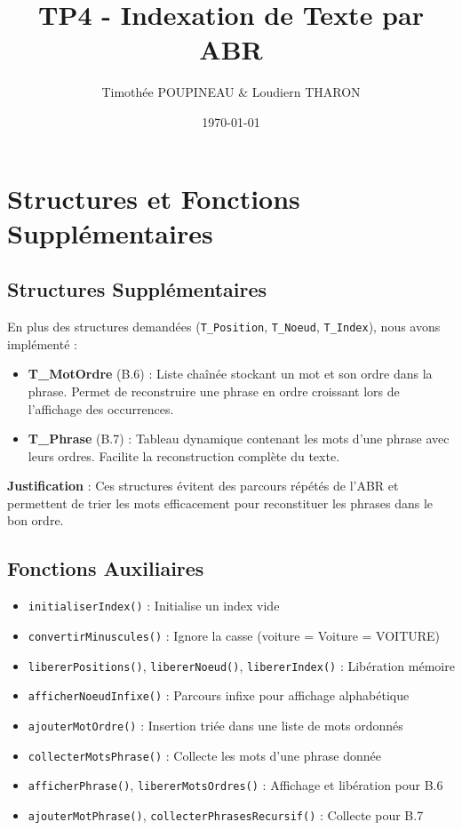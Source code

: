 \documentclass[11pt,a4paper]{article}
\title{\textbf{TP4 - Indexation de Texte par ABR}}
\author{Timothée POUPINEAU \& Loudiern THARON}
\date{\today}
\begin{document}
\maketitle

\section{Structures et Fonctions Supplémentaires}

\subsection{Structures Supplémentaires}

En plus des structures demandées (\texttt{T\_Position}, \texttt{T\_Noeud}, \texttt{T\_Index}), nous avons implémenté :

\begin{itemize}[noitemsep]
    \item \textbf{T\_MotOrdre} (B.6) : Liste chaînée stockant un mot et son ordre dans la phrase. Permet de reconstruire une phrase en ordre croissant lors de l'affichage des occurrences.
    \item \textbf{T\_Phrase} (B.7) : Tableau dynamique contenant les mots d'une phrase avec leurs ordres. Facilite la reconstruction complète du texte.
\end{itemize}

\textbf{Justification} : Ces structures évitent des parcours répétés de l'ABR et permettent de trier les mots efficacement pour reconstituer les phrases dans le bon ordre.

\subsection{Fonctions Auxiliaires}

\begin{itemize}[noitemsep]
    \item \texttt{initialiserIndex()} : Initialise un index vide
    \item \texttt{convertirMinuscules()} : Ignore la casse (voiture = Voiture = VOITURE)
    \item \texttt{libererPositions()}, \texttt{libererNoeud()}, \texttt{libererIndex()} : Libération mémoire
    \item \texttt{afficherNoeudInfixe()} : Parcours infixe pour affichage alphabétique
    \item \texttt{ajouterMotOrdre()} : Insertion triée dans une liste de mots ordonnés
    \item \texttt{collecterMotsPhrase()} : Collecte les mots d'une phrase donnée
    \item \texttt{afficherPhrase()}, \texttt{libererMotsOrdres()} : Affichage et libération pour B.6
    \item \texttt{ajouterMotPhrase()}, \texttt{collecterPhrasesRecursif()} : Collecte pour B.7
\end{itemize}
\end{document}
